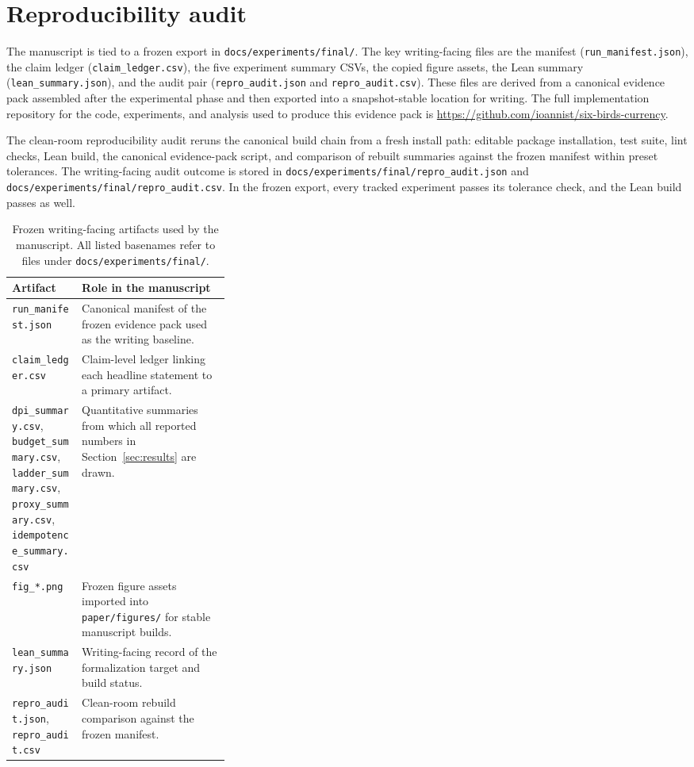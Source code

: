 \documentclass[11pt,a4paper]{article}
\DeclareRobustCommand{\code}[1]{{\begingroup\urlstyle{tt}\nolinkurl{#1}\endgroup}}
\begin{document}
 \section{Reproducibility audit}\label{app:repro}

The manuscript is tied to a frozen export in \code{docs/experiments/final/}. The key writing-facing files are the manifest (\code{run_manifest.json}), the claim ledger (\code{claim_ledger.csv}), the five experiment summary CSVs, the copied figure assets, the Lean summary (\code{lean_summary.json}), and the audit pair (\code{repro_audit.json} and \code{repro_audit.csv}). These files are derived from a canonical evidence pack assembled after the experimental phase and then exported into a snapshot-stable location for writing. The full implementation repository for the code, experiments, and analysis used to produce this evidence pack is \url{https://github.com/ioannist/six-birds-currency}.

The clean-room reproducibility audit reruns the canonical build chain from a fresh install path: editable package installation, test suite, lint checks, Lean build, the canonical evidence-pack script, and comparison of rebuilt summaries against the frozen manifest within preset tolerances. The writing-facing audit outcome is stored in \code{docs/experiments/final/repro_audit.json} and \code{docs/experiments/final/repro_audit.csv}. In the frozen export, every tracked experiment passes its tolerance check, and the Lean build passes as well.

\begin{table}[tbp]
    \centering
    \small
    \setlength{\tabcolsep}{6pt}
    \renewcommand{\arraystretch}{1.1}
    \caption{Frozen writing-facing artifacts used by the manuscript. All listed basenames refer to files under {\small\texttt{docs/experiments/final/}}.}
    \label{tab:frozenassets}
    \begin{tabularx}{\linewidth}{L{0.32\linewidth}Y}
        \toprule
        Artifact & Role in the manuscript \\
        \midrule
        \code{run_manifest.json} & Canonical manifest of the frozen evidence pack used as the writing baseline. \\
        \code{claim_ledger.csv} & Claim-level ledger linking each headline statement to a primary artifact. \\
        \code{dpi_summary.csv}, \code{budget_summary.csv}, \code{ladder_summary.csv}, \code{proxy_summary.csv}, \code{idempotence_summary.csv} & Quantitative summaries from which all reported numbers in Section~\ref{sec:results} are drawn. \\
        \code{fig_*.png} & Frozen figure assets imported into \code{paper/figures/} for stable manuscript builds. \\
        \code{lean_summary.json} & Writing-facing record of the formalization target and build status. \\
        \code{repro_audit.json}, \code{repro_audit.csv} & Clean-room rebuild comparison against the frozen manifest. \\
        \bottomrule
    \end{tabularx}
\end{table}
\end{document}
